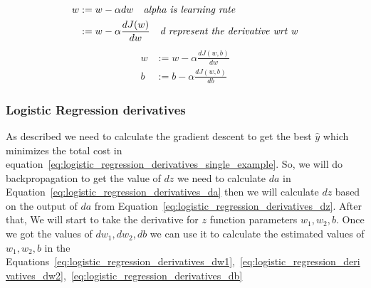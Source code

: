 \begin{equation}\label{eq:gredient_descent_w}
  \begin{split}
    w & := w - \alpha dw \quad \text{\textit{alpha is learning rate}}\\
      & := w - \alpha \frac{dJ(w)}{dw} \quad \text{\textit{d represent the derivative wrt w}}
  \end{split}
\end{equation}
%
\begin{subequations}
     \begin{align}
w& := w - \alpha \frac{dJ(w,b)}{dw} \label{eq:gradient_descent_j_w}\\
b& := b - \alpha \frac{dJ(w,b)}{db} \label{eq:gradient_descent_j_b}
     \end{align}
   \end{subequations}
   






  \subsubsection{Logistic Regression derivatives}\label{logistic_bp_derivatives}

  As described we need to calculate the gradient descent to get the best $\widehat{y}$ which minimizes the total cost in equation~\eqref{eq:logistic_regression_derivatives_single_example}. So, we will do backpropagation to get the value of $dz$ we need to calculate $da$ in Equation~\eqref{eq:logistic_regression_derivatives_da} then we will calculate $dz$ based on the output of $da$ from Equation~\eqref{eq:logistic_regression_derivatives_dz}. After that, We will start to take the derivative for $z$ function parameters \textbf{\textit{$w_1,w_2,b$}}. Once we got the values of \textbf{\textit{$dw_1,dw_2,db$}} we can use it to calculate the estimated values of \textbf{\textit{$w_1,w_2,b$}} in the Equations~\eqref{eq:logistic_regression_derivatives_dw1},~\eqref{eq:logistic_regression_derivatives_dw2},~\eqref{eq:logistic_regression_derivatives_db}

